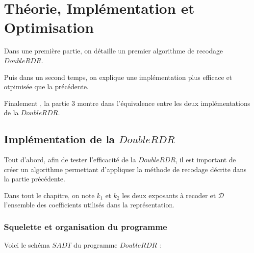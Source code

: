 \documentclass[12pt, a4paper]{memoir}
\begin{document}

  

\chapter{Théorie, Implémentation et Optimisation}

Dans une première partie, on détaille un premier algorithme de recodage $DoubleRDR$.

Puis dans un second temps, on explique une implémentation plus efficace et otpimisée que la précédente.

Finalement , la partie $3$ montre dans l'équivalence entre les deux implémentations de la $DoubleRDR$.

\section{Implémentation de la $DoubleRDR$}

Tout d'abord, afin de tester l'efficacité de la $DoubleRDR$, il est important de créer un algorithme permettant
d'appliquer la méthode de recodage décrite dans la partie précédente.

Dans tout le chapitre, on note $k_1$ et $k_2$ les deux exposants à recoder et $\mathcal{D}$ l'ensemble des coefficients
utilisés dans la représentation.

\subsection{Squelette et organisation du programme}

Voici le schéma $SADT$ du programme $DoubleRDR$ :

\begin{center}
\end{center}
\end{document}
